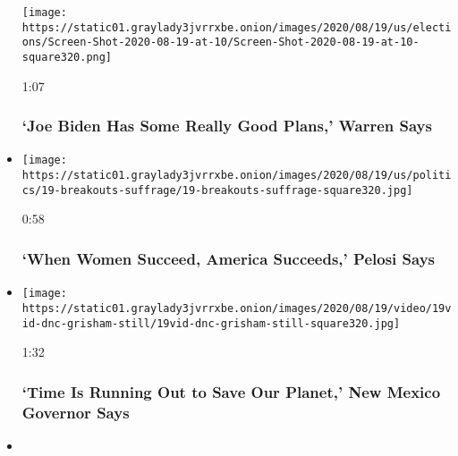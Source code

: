 \begin{itemize}
  \texttt{[image: https://static01.graylady3jvrrxbe.onion/images/2020/08/19/us/elections/Screen-Shot-2020-08-19-at-10/Screen-Shot-2020-08-19-at-10-square320.png]}

  1:07

  \hypertarget{joe-biden-has-some-really-good-plans-warren-says}{%
  \subsubsection{`Joe Biden Has Some Really Good Plans,' Warren
  Says}\label{joe-biden-has-some-really-good-plans-warren-says}}
\item
  \href{https://www.nytimes3xbfgragh.onion/video/us/elections/100000007297617/nancy-pelosi-speaks-dnc.html?action=click\&module=video-series-bar\&region=header\&pgtype=Article\&playlistId=video/2020-Elections}{}

  \texttt{[image: https://static01.graylady3jvrrxbe.onion/images/2020/08/19/us/politics/19-breakouts-suffrage/19-breakouts-suffrage-square320.jpg]}

  0:58

  \hypertarget{when-women-succeed-america-succeeds-pelosi-says}{%
  \subsubsection{`When Women Succeed, America Succeeds,' Pelosi
  Says}\label{when-women-succeed-america-succeeds-pelosi-says}}
\item
  \href{https://www.nytimes3xbfgragh.onion/video/us/elections/100000007297726/michelle-lujan-grisham-speaks-dnc.html?action=click\&module=video-series-bar\&region=header\&pgtype=Article\&playlistId=video/2020-Elections}{}

  \texttt{[image: https://static01.graylady3jvrrxbe.onion/images/2020/08/19/video/19vid-dnc-grisham-still/19vid-dnc-grisham-still-square320.jpg]}

  1:32

  \hypertarget{time-is-running-out-to-save-our-planet-new-mexico-governor-says}{%
  \subsubsection{`Time Is Running Out to Save Our Planet,' New Mexico
  Governor
  Says}\label{time-is-running-out-to-save-our-planet-new-mexico-governor-says}}
\item
  \href{https://www.nytimes3xbfgragh.onion/video/us/elections/100000007297618/hillary-clinton-speaks-dnc.html?action=click\&module=video-series-bar\&region=header\&pgtype=Article\&playlistId=video/2020-Elections}{}


\end{itemize}
